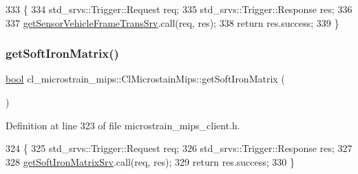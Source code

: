 \begin{DoxyCode}
333     \{
334         std\_srvs::Trigger::Request req;
335         std\_srvs::Trigger::Response res;
336 
337         \hyperlink{classcl__microstrain__mips_1_1ClMicrostainMips_abeafc4f48f26ddd264e61b6cf97c779f}{getSensorVehicleFrameTransSrv}.call(req, res);
338         \textcolor{keywordflow}{return} res.success;
339     \}
\end{DoxyCode}
\mbox{\label{classcl__microstrain__mips_1_1ClMicrostainMips_ad605051aea5b2fe25de85314deb1aa39}} 
\subsubsection{\texorpdfstring{get\+Soft\+Iron\+Matrix()}{getSoftIronMatrix()}}
{\footnotesize\ttfamily \hyperlink{classbool}{bool} cl\+\_\+microstrain\+\_\+mips\+::\+Cl\+Microstain\+Mips\+::get\+Soft\+Iron\+Matrix (\begin{DoxyParamCaption}{ }\end{DoxyParamCaption})\hspace{0.3cm}{\ttfamily [inline]}}



Definition at line 323 of file microstrain\+\_\+mips\+\_\+client.\+h.


\begin{DoxyCode}
324     \{
325         std\_srvs::Trigger::Request req;
326         std\_srvs::Trigger::Response res;
327 
328         \hyperlink{classcl__microstrain__mips_1_1ClMicrostainMips_a7210454a851669073d06d82511014ecc}{getSoftIronMatrixSrv}.call(req, res);
329         \textcolor{keywordflow}{return} res.success;
330     \}
\end{DoxyCode}
\mbox{\label{classcl__microstrain__mips_1_1ClMicrostainMips_afca57a1888e4e57f6dba69083e53442d}} 
